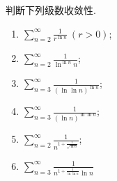 \documentclass[../../main.tex]{subfiles}%
\begin{document}
\begin{example}
判断下列级数收敛性.
\begin{enumerate}
\item $\sum_{n=2}^{\infty} \frac{1}{r^{\ln n}}\ (r > 0)$;

\item $\sum_{n=2}^{\infty} \frac{1}{\ln^{\ln n} n}$;

\item $\sum_{n=3}^{\infty} \frac{1}{(\ln \ln n)^{\ln n}}$;

\item $\sum_{n=3}^{\infty} \frac{1}{(\ln n)^{\ln \ln n}}$;

\item $\sum_{n=2}^{\infty} \frac{1}{n^{1 + \frac{1}{\sqrt{\ln n}}}}$;

\item $\sum_{n=3}^{\infty} \frac{1}{n^{1 + \frac{1}{\ln \ln n}} \ln n}$
\end{enumerate}
\end{example}
\end{document}
